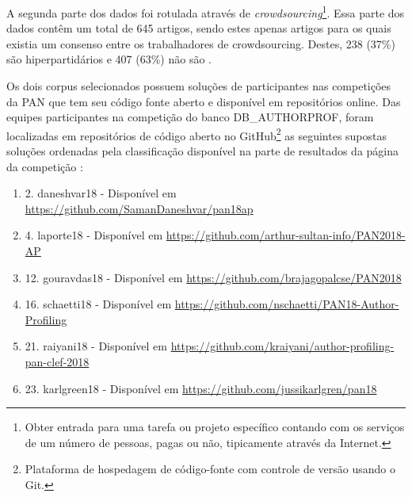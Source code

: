 \begin{itemize}
        A segunda parte dos dados foi rotulada através de \textit{crowdsourcing}\footnote{Obter entrada para uma tarefa ou projeto específico contando com os serviços de um número de pessoas, pagas ou não, tipicamente através da Internet.}. 
        Essa parte dos dados contêm um total de 645 artigos, sendo estes apenas artigos para os quais existia um consenso entre os trabalhadores de crowdsourcing. 
        Destes, 238 (37\%) são hiperpartidários e 407 (63\%) não são \cite{johannes_kiesel_2018_1489920}. 
        
    \end{itemize}
    
    Os dois corpus selecionados possuem soluções de participantes nas competições da PAN que tem seu código fonte aberto e disponível em repositórios online.
    Das equipes participantes na competição do banco DB\_AUTHORPROF, foram localizadas em repositórios de código aberto no GitHub\footnote{Plataforma de hospedagem de código-fonte com controle de versão usando o Git.} as seguintes supostas soluções ordenadas pela classificação disponível na parte de resultados da página da competição \cite{PAN_APCLEF_2018}:
    \begin{enumerate}[label=\Roman*.]
        \item 2. daneshvar18 - Disponível em \url{https://github.com/SamanDaneshvar/pan18ap}
        
        \item 4. laporte18 - Disponível em \url{https://github.com/arthur-sultan-info/PAN2018-AP}
        
        \item 12. gouravdas18 - Disponível em \url{https://github.com/brajagopalcse/PAN2018}
        
        \item 16. schaetti18 - Disponível em \url{https://github.com/nschaetti/PAN18-Author-Profiling}
        
        \item 21. raiyani18 - Disponível em \url{https://github.com/kraiyani/author-profiling-pan-clef-2018}
        
        \item 23. karlgreen18 - Disponível em \url{ https://github.com/jussikarlgren/pan18}
    \end{enumerate}

